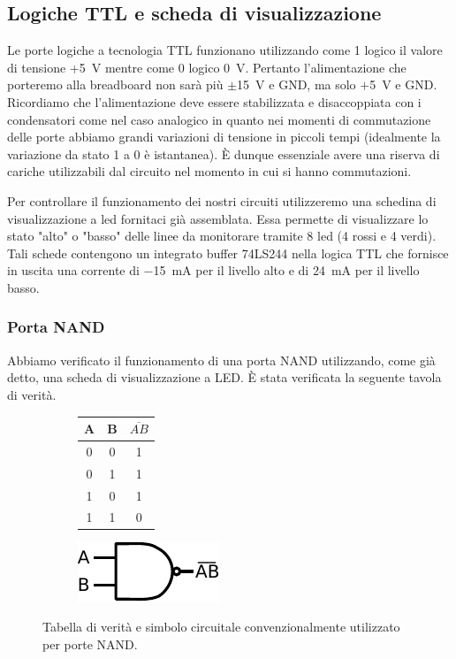 \subsection{Logiche TTL e scheda di visualizzazione}

Le porte logiche a tecnologia TTL funzionano utilizzando come 1 logico il valore di tensione +\SI{5}{\volt} mentre come 0 logico \SI{0}{\volt}.
Pertanto l'alimentazione che porteremo alla breadboard non sarà più $\pm$\SI{15}{\V} e GND, ma solo $+$\SI{5}{\V} e GND.
Ricordiamo che l'alimentazione deve essere stabilizzata e disaccoppiata con i condensatori come nel caso analogico in quanto nei momenti di commutazione delle porte abbiamo grandi variazioni di tensione in piccoli tempi (idealmente la variazione da stato 1 a 0 è istantanea).
È dunque essenziale avere una riserva di cariche utilizzabili dal circuito nel momento in cui si hanno commutazioni.

Per controllare il funzionamento dei nostri circuiti utilizzeremo una schedina di visualizzazione a led fornitaci già assemblata.
Essa permette di visualizzare lo stato "alto" o "basso" delle linee da monitorare tramite 8 led (4 rossi e 4 verdi).
Tali schede contengono un integrato buffer 74LS244 nella logica TTL che fornisce in uscita una corrente di \SI{-15}{\milli\ampere} per il livello alto e di \SI{24}{\milli\ampere} per il livello basso.

\subsubsection{Porta NAND}

Abbiamo verificato il funzionamento di una porta NAND utilizzando, come già detto, una scheda di visualizzazione a LED.
È stata verificata la seguente tavola di verità.\\

\begin{figure}[htpc]
\centering
	\begin{subfigure}[hc]{.4\textwidth}
		\centering
		{\renewcommand{\arraystretch}{1.2}%
		\begin{tabular}{|c|c|c|}
		\hline
		A & B & $\overline{AB}$ \\
		\hline
		0 & 0 & 1\\
		\hline
		0 & 1 & 1\\
		\hline
		1 & 0 & 1\\
		\hline
		1 & 1 & 0\\
		\hline
		\end{tabular}}
		\label{tab9:NAND}
        \end{subfigure}
        \begin{subfigure}[hc]{.4\textwidth}
		\centering
		\includegraphics[width=.35\textwidth]{../E09/latex/NAND.pdf}
		\label{cir9:nand}
        \end{subfigure}
\caption{Tabella di verità e simbolo circuitale convenzionalmente utilizzato per porte NAND.}
\end{figure}

